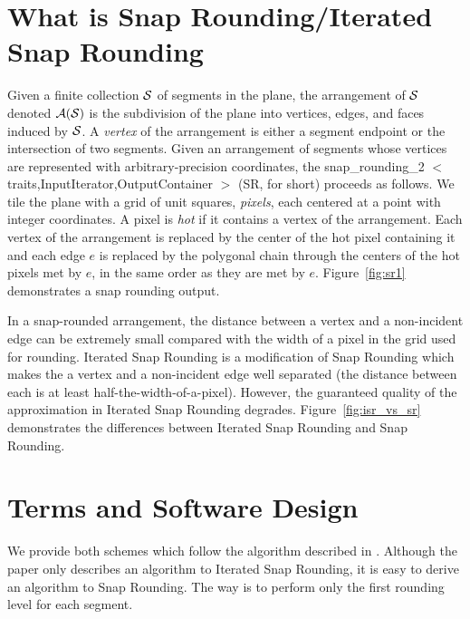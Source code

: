 \section{What is Snap Rounding/Iterated Snap Rounding}
Given a finite collection $\S$ of segments in the plane, the
arrangement of $\S$ denoted $\A(\S)$ is the subdivision of the plane
into vertices, edges, and faces induced by $\S$. %
A {\it vertex\/} of the arrangement is either a segment endpoint or
the intersection of two segments. Given an arrangement of segments
whose vertices are represented with arbitrary-precision coordinates,
the snap\_rounding\_2 $<$ traits,InputIterator,OutputContainer $>$
(SR, for short) proceeds as follows.  We tile the plane
with a grid of unit squares, {\it pixels}, each centered at a point
with integer coordinates. A pixel is {\it hot\/} if it contains a
vertex of the arrangement. Each vertex of the arrangement is replaced
by the center of the hot pixel containing it and each edge $e$ is
replaced by the polygonal chain through the centers of the hot pixels
met by $e$, in the same order as they are met by $e$. 
Figure~\ref{fig:sr1} demonstrates a snap rounding output. 

In a snap-rounded arrangement, the distance between a vertex and
a non-incident edge can be extremely small compared with the width of a
pixel in the grid used for rounding. Iterated Snap Rounding is a modification
of Snap Rounding which makes the a vertex and a non-incident edge well separated
(the distance between each is at least half-the-width-of-a-pixel).
However, the guaranteed quality of the approximation in Iterated Snap Rounding
degrades. Figure~\ref{fig:isr_vs_sr} demonstrates the differences between Iterated
Snap Rounding and Snap Rounding.

\section{Terms and Software Design}

We provide both schemes which follow the algorithm described in \cite{isr-2002}.
Although the paper only describes an algorithm to Iterated Snap Rounding,
it is easy to derive an algorithm to Snap Rounding. The way is to perform only
the first rounding level for each segment.

